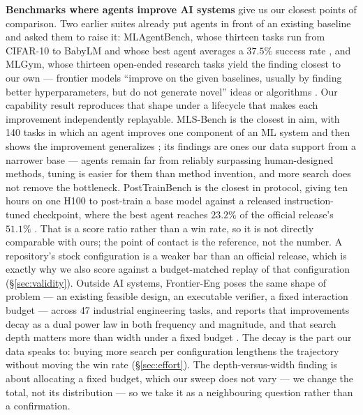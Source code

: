\textbf{Benchmarks where agents improve AI systems} give us our closest points of comparison. Two earlier suites already put agents in front of an existing
baseline and asked them to raise it: MLAgentBench, whose thirteen tasks run from CIFAR-10 to BabyLM and
whose best agent averages a $37.5\%$ success rate \citep{huang2024mlagentbench}, and MLGym, whose
thirteen open-ended research tasks yield the finding closest to our own --- frontier models ``improve on
the given baselines, usually by finding better hyperparameters, but do not generate novel'' ideas or
algorithms \citep{nathani2025mlgym}. Our capability result reproduces that shape under a lifecycle that
makes each improvement independently replayable. MLS-Bench is the closest in aim, with 140 tasks in
which an agent improves one component of an ML system and then shows the improvement generalizes
\citep{lyu2026mlsbench}; its findings are ones our data support from a
narrower base --- agents remain far from reliably surpassing human-designed methods, tuning is easier
for them than method invention, and more search does not remove the bottleneck. PostTrainBench is the
closest in protocol, giving ten hours on one H100 to post-train a base model against a released
instruction-tuned checkpoint, where the best agent reaches $23.2\%$ of the official release's $51.1\%$
\citep{rank2026posttrainbench}. That is a score ratio rather than a win rate, so it is not directly
comparable with ours; the point of contact is the reference, not the number. A repository's stock
configuration is a weaker bar than an official release, which is exactly why we also score against a
budget-matched replay of that configuration (\S\ref{sec:validity}). Outside AI systems, Frontier-Eng poses
the same shape of problem --- an existing feasible design, an executable verifier, a fixed interaction
budget --- across 47 industrial engineering tasks, and reports that improvements decay as a dual power law in both frequency and
magnitude, and that search depth matters more than width under a fixed budget
\citep{einsia2026frontiereng}. The decay is the part our data speaks to: buying more search per
configuration lengthens the trajectory without moving the win rate (\S\ref{sec:effort}). The
depth-versus-width finding is about allocating a fixed budget, which our sweep does not vary --- we
change the total, not its distribution --- so we take it as a neighbouring question rather than a
confirmation.

